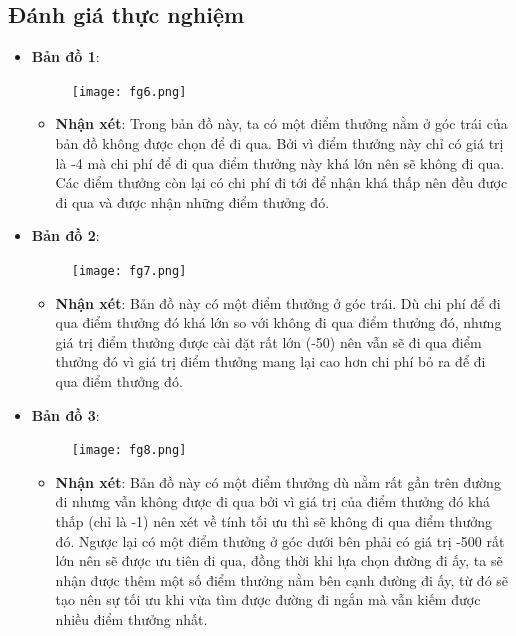 \documentclass[11pt]{scrartcl} %
\begin{document}
\subsection{Đánh giá thực nghiệm}
\begin{itemize}
	\item \textbf{Bản đồ 1}:
	\begin{figure}[h] %
		\centering
		\texttt{[image: fg6.png]} %
	\end{figure}
	\begin{itemize}
		\item \textbf{Nhận xét}: Trong bản đồ này, ta có một điểm thưởng nằm ở góc trái của bản đồ không được chọn để đi qua. Bởi vì điểm thưởng này chỉ có giá trị là -4 mà chi phí để đi qua điểm thưởng này khá lớn nên sẽ không đi qua. Các điểm thưởng còn lại có chi phí đi tới để nhận khá thấp nên đều được đi qua và được nhận những điểm thưởng đó.
	\end{itemize}

	\newpage
	\item \textbf{Bản đồ 2}:
	\begin{figure}[h]
		\centering
		\texttt{[image: fg7.png]} %
	\end{figure}
	\begin{itemize}
		\item \textbf{Nhận xét}: Bản đồ này có một điểm thưởng ở góc trái. Dù chi phí để đi qua điểm thưởng đó khá lớn so với không đi qua điểm thưởng đó, nhưng giá trị điểm thưởng được cài đặt rất lớn (-50) nên vẫn sẽ đi qua điểm thưởng đó vì giá trị điểm thưởng mang lại cao hơn chi phí bỏ ra để đi qua điểm thưởng đó. 
	\end{itemize}

	\newpage
	\item \textbf{Bản đồ 3}:
	\begin{figure}[h]
		\centering
		\texttt{[image: fg8.png]} %
	\end{figure}
	\begin{itemize}
		\item \textbf{Nhận xét}: Bản đồ này có một điểm thưởng dù nằm rất gần trên đường đi nhưng vẫn không được đi qua bởi vì giá trị của điểm thưởng đó khá thấp (chỉ là -1) nên xét về tính tối ưu thì sẽ không đi qua điểm thưởng đó. Ngược lại có một điểm thưởng ở góc dưới bên phải có giá trị -500 rất lớn nên sẽ được ưu tiên đi qua, đồng thời khi lựa chọn đường đi ấy, ta sẽ nhận được thêm một số điểm thưởng nằm bên cạnh đường đi ấy, từ đó sẽ tạo nên sự tối ưu khi vừa tìm được đường đi ngắn mà vẫn kiếm được nhiều điểm thưởng nhất.
	\end{itemize}
\end{itemize}



\end{document}
